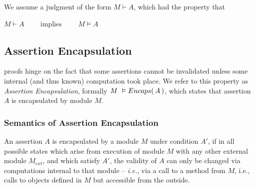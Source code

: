 %

\begin{axiom}
We assume a judgment of the form $M \vdash A$, which had the property that\\
\strut \hspace{5cm} $M \vdash A $ \ \ \ \ implies \ \ \ \ $M \vDash A$
\end{axiom}


\subsection {Assertion Encapsulation}
\label{s:encaps-proof}

{
{\SpecLang proofs  hinge on the fact that some assertions cannot be invalidated unless some 
} internal (and thus known)
computation took place. 
{We refer to this property as \emph{Assertion Encapsulation},}
}
formally $M\ \vDash  {\ensuremath Encaps(\, A\, )}$, which states that 
 assertion $A$ is encapsulated by module $M$.


\subsubsection{Semantics of Assertion Encapsulation}

{An assertion $A$  is  encapsulated by a module $M$ under condition $A'$,
if in all possible states which arise from execution of module $M$ with any other external module $M_{ext}$, and which satisfy $A'$, 
the validity of $A$} 
{ can only be changed via computations internal to that module} -- \emph{i.e.},  via a call to
a method from $M$, i.e.,
calls to objects defined in $M$ but accessible from the
outside.


